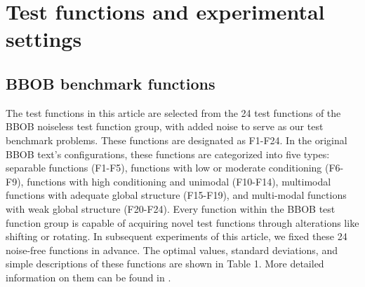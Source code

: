 \documentclass{article}
\begin{document}
\section{Test functions and experimental settings}
\subsection{BBOB benchmark functions}

\hspace{2em}The test functions in this article are selected from the 24 test functions of the BBOB noiseless test function group, with added noise to serve as our test benchmark problems. These functions are designated as F1-F24. In the original BBOB text's configurations, these functions are categorized into five types: separable functions (F1-F5), functions with low or moderate conditioning (F6-F9), functions with high conditioning and unimodal (F10-F14), multimodal functions with adequate global structure (F15-F19), and multi-modal functions with weak global structure (F20-F24). Every function within the BBOB test function group is capable of acquiring novel test functions through alterations like shifting or rotating. In subsequent experiments of this article, we fixed these 24 noise-free functions in advance. The optimal values, standard deviations, and simple descriptions of these functions are shown in Table 1. More detailed information on them can be found in \citep{Hansen2010RealParameterBO}.
\end{document}
